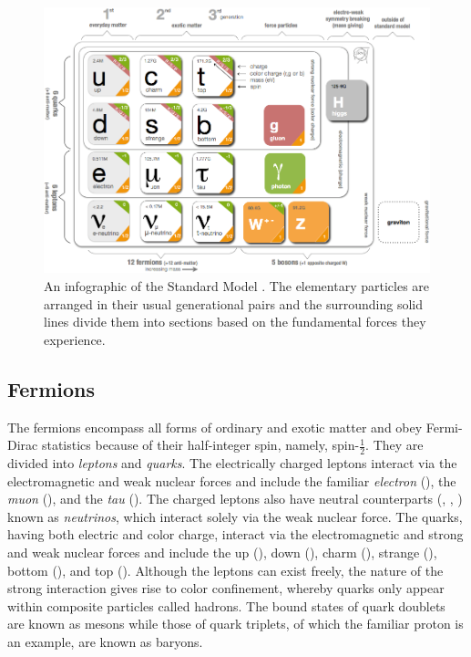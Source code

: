 \begin{figure}[htbp]
  \centering
    \includegraphics[width=6in]{images/SMinfographic_image}
    \caption[Standard Model Infographic]{An infographic of the Standard Model \cite{Purcell:1473657}. The elementary particles are arranged in their usual generational pairs and the surrounding solid lines divide them into sections based on the fundamental forces they experience.}
    \label{fig:SM}
\end{figure}

\subsection{Fermions}

The fermions encompass all forms of ordinary and exotic matter and obey Fermi-Dirac statistics because of their half-integer spin, namely, spin-\ensuremath{\frac{1}{2}}. They are divided into \textit{leptons} and \textit{quarks}. The electrically charged leptons interact via the electromagnetic and weak nuclear forces and include the familiar \textit{electron} (\lepe), the \textit{muon} (\lepm), and the \textit{tau} (\lept). The charged leptons also have neutral counterparts (\lepne, \lepnm, \lepnt) known as \textit{neutrinos}, which interact solely via the weak nuclear force. The quarks, having both electric and color charge, interact via the electromagnetic and strong and weak nuclear forces and include the up (\qrku), down (\qrkd), charm (\qrkc), strange (\qrks), bottom (\qrkb), and top (\qrkt). Although the leptons can exist freely, the nature of the strong interaction gives rise to color confinement, whereby quarks only appear within composite particles called hadrons. The bound states of quark doublets are known as mesons while those of quark triplets, of which the familiar proton is an example, are known as baryons.


